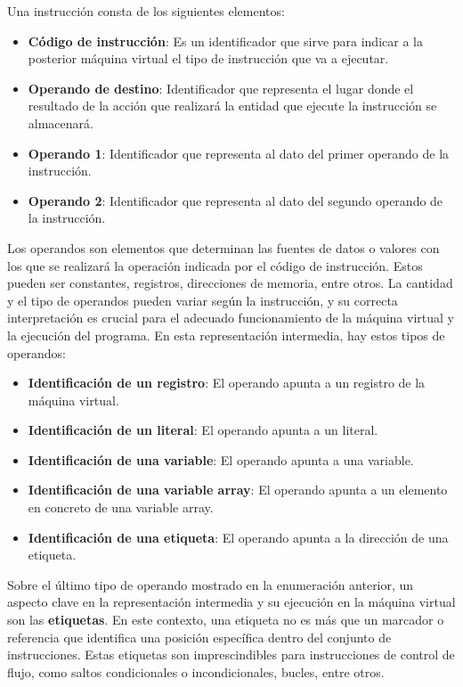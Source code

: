\vspace{0.5cm}
\noindent
Una instrucción consta de los siguientes elementos:

\begin{itemize}
    \item \textbf{Código de instrucción}: Es un identificador que sirve para indicar a la posterior máquina virtual el tipo de instrucción que va a ejecutar.
    \item \textbf{Operando de destino}: Identificador que representa el lugar donde el resultado de la acción que realizará la entidad que ejecute la instrucción se almacenará.
    \item \textbf{Operando 1}: Identificador que representa al dato del primer operando de la instrucción.
    \item \textbf{Operando 2}: Identificador que representa al dato del segundo operando de la instrucción.
\end{itemize}

Los operandos son elementos que determinan las fuentes de datos o valores con los que se realizará la operación indicada por el código de instrucción. Estos pueden ser constantes, registros, direcciones de memoria, entre otros. La cantidad y el tipo de operandos pueden variar según la instrucción, y su correcta interpretación es crucial para el adecuado funcionamiento de la máquina virtual y la ejecución del programa. En esta representación intermedia, hay estos tipos de operandos:

\begin{itemize}
    \item \textbf{Identificación de un registro}: El operando apunta a un registro de la máquina virtual.
    \item \textbf{Identificación de un literal}: El operando apunta a un literal.
    \item \textbf{Identificación de una variable}: El operando apunta a una variable.
    \item \textbf{Identificación de una variable array}: El operando apunta a un elemento en concreto de una variable array.
    \item \textbf{Identificación de una etiqueta}: El operando apunta a la dirección de una etiqueta.
\end{itemize}

Sobre el último tipo de operando mostrado en la enumeración anterior, un aspecto clave en la representación intermedia y su ejecución en la máquina virtual son las \textbf{etiquetas}. En este contexto, una etiqueta no es más que un marcador o referencia que identifica una posición específica dentro del conjunto de instrucciones. Estas etiquetas son imprescindibles para instrucciones de control de flujo, como saltos condicionales o incondicionales, bucles, entre otros.

